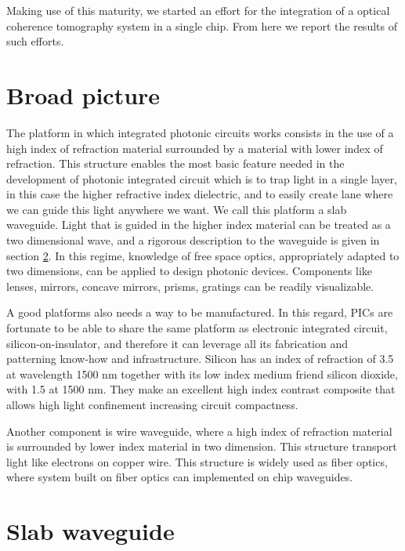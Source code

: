 \documentclass[12pt,twoside,english]{book}
\renewcommand{\~}{\perispomeni}%
\numberwithin{equation}{section}
\numberwithin{figure}{section}
\begin{document}
Making use of this maturity, we started an effort for the integration of a optical coherence tomography system in a single chip. From here we report the results of such efforts. 

\section{Broad picture}

The platform in which integrated photonic circuits works consists in the use of a high index of refraction material surrounded by a material with lower index of refraction. This structure enables the most basic feature needed in the development of photonic integrated circuit which is to trap light in a single layer, in this case the higher refractive index dielectric, and to easily create lane where we can guide this light anywhere we want. We call this platform a \gls{slab waveguide}. Light that is guided in the higher index material can be treated as a two dimensional wave, and a rigorous description to the waveguide is given in section \ref{section:slab waveguide}. In this regime, knowledge of free space optics, appropriately adapted to two dimensions, can be applied to design photonic devices. Components like lenses, mirrors, concave mirrors, prisms, gratings can be readily visualizable.

A good platforms also needs a way to be manufactured. In this regard, PICs are fortunate to be able to share the same platform as electronic integrated circuit, silicon-on-insulator, and therefore it can leverage all its fabrication and patterning know-how and infrastructure. Silicon has an index of refraction of 3.5 at wavelength 1500 nm together with its low index medium friend silicon dioxide, with 1.5 at 1500 nm. They make an excellent high index contrast composite that allows high light confinement increasing circuit compactness.

Another component is wire waveguide, where a high index of refraction material is surrounded by lower index material in two dimension. This structure transport light like electrons on copper wire. This structure is widely used as fiber optics, where system built on fiber optics can implemented on chip waveguides.



\section{Slab waveguide}
\label{section:slab waveguide}
\end{document}
